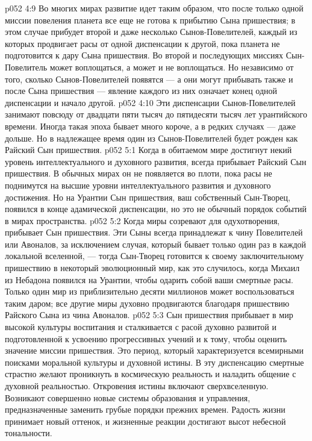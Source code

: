 \vs p052 4:9 \pc Во многих мирах развитие идет таким образом, что после только одной миссии повеления планета все еще не готова к прибытию Сына пришествия; в этом случае прибудет второй и даже несколько Сынов\hyp{}Повелителей, каждый из которых продвигает расы от одной диспенсации к другой, пока планета не подготовится к дару Сына пришествия. Во второй и последующих миссиях Сын\hyp{}Повелитель может воплощаться, а может и не воплощаться. Но независимо от того, сколько Сынов\hyp{}Повелителей появятся --- а они могут прибывать также и после Сына пришествия --- явление каждого из них означает конец одной диспенсации и начало другой.
\vs p052 4:10 \pc Эти диспенсации Сынов\hyp{}Повелителей занимают повсюду от двадцати пяти тысяч до пятидесяти тысяч лет урантийского времени. Иногда такая эпоха бывает много короче, а в редких случаях --- даже дольше. Но в надлежащее время один из Сынов\hyp{}Повелителей будет рожден как Райский Сын пришествия.
\vs p052 5:1 Когда в обитаемом мире достигнут некий уровень интеллектуального и духовного развития, всегда прибывает Райский Сын пришествия. В обычных мирах он не появляется во плоти, пока расы не поднимутся на высшие уровни интеллектуального развития и духовного достижения. Но на Урантии Сын пришествия, ваш собственный Сын\hyp{}Творец, появился в конце адамической диспенсации, но это не обычный порядок событий в мирах пространства.
\vs p052 5:2 Когда миры созревают для одухотворения, прибывает Сын пришествия. Эти Сыны всегда принадлежат к чину Повелителей или Авоналов, за исключением случая, который бывает только один раз в каждой локальной вселенной, --- тогда Сын\hyp{}Творец готовится к своему заключительному пришествию в некоторый эволюционный мир, как это случилось, когда Михаил из Небадона появился на Урантии, чтобы одарить собой ваши смертные расы. Только один мир из приблизительно десяти миллионов может воспользоваться таким даром; все другие миры духовно продвигаются благодаря пришествию Райского Сына из чина Авоналов.
\vs p052 5:3 \pc Сын пришествия прибывает в мир высокой культуры воспитания и сталкивается с расой духовно развитой и подготовленной к усвоению прогрессивных учений и к тому, чтобы оценить значение миссии пришествия. Это период, который характеризуется всемирными поисками моральной культуры и духовной истины. В эту диспенсацию смертные страстно желают проникнуть в космическую реальность и наладить общение с духовной реальностью. Откровения истины включают сверхвселенную. Возникают совершенно новые системы образования и управления, предназначенные заменить грубые порядки прежних времен. Радость жизни принимает новый оттенок, и жизненные реакции достигают высот небесной тональности.
